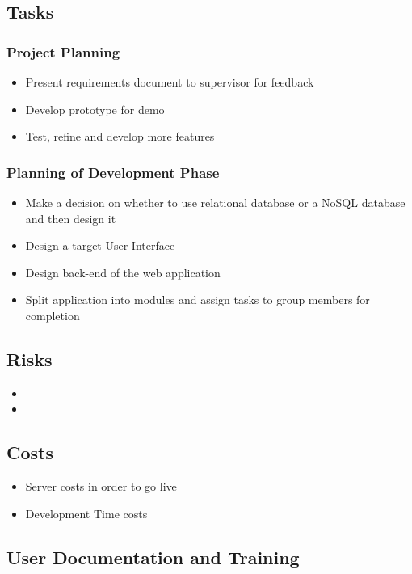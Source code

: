 \documentclass[12pt]{article}
\begin{document}
\subsection{Tasks}
\subsubsection{Project Planning}
\begin{itemize}
\item Present requirements document to supervisor for feedback
\item Develop prototype for demo
\item Test, refine and develop more features
\end{itemize}
\subsubsection{Planning of Development Phase}
\begin{itemize}
\item Make a decision on whether to use relational database or a NoSQL database and then design it
\item Design a target User Interface
\item Design back-end of the web application
\item Split application into modules and assign tasks to group members for completion
\end{itemize}

\subsection{Risks} 
\begin{itemize}
\item
\item
\end{itemize}


\subsection{Costs} 
\begin{itemize}
\item Server costs in order to go live
\item Development Time costs
\end{itemize}

\subsection{User Documentation and Training} 
\end{document}
